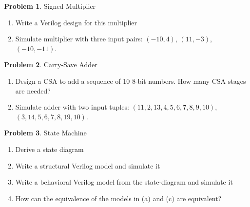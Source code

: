 \documentclass[10pt]{article}
\theoremstyle{definition}
\newtheorem{problem}{Problem}
\begin{document}
  \newpage

  \begin{problem}
    Signed Multiplier

    \begin{enumerate}
      \item Write a Verilog design for this multiplier
      \item Simulate multiplier with three input pairs: $(-10, 4)$, $(11, -3)$, $(-10, -11)$.
    \end{enumerate}
  \end{problem}

  \newpage

  \begin{problem}
    Carry-Save Adder

    \begin{enumerate}
      \item Design a CSA to add a sequence of 10 8-bit numbers. How many CSA stages are needed?
      \item Simulate adder with two input tuples: $(11, 2, 13, 4, 5, 6, 7, 8, 9, 10)$, $(3, 14, 5, 6, 7, 8, 19, 10)$.
    \end{enumerate}
  \end{problem}

  \newpage

  \begin{problem}
    State Machine

    \begin{enumerate}
      \item Derive a state diagram
      \item Write a structural Verilog model and simulate it
      \item Write a behavioral Verilog model from the state-diagram and simulate it
      \item How can the equivalence of the models in (a) and (c) are equivalent?
    \end{enumerate}
  \end{problem}
\end{document}
